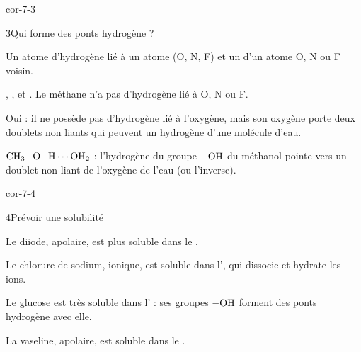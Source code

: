 \begin{blocLivre}{cor-7-3}
\begin{corrige}{3}{Qui forme des ponts hydrogène ?}
\begin{questions}
\item Un atome d'hydrogène lié à un atome  (O, N, F) et un  d'un atome O, N ou F
voisin.
\item {}, ,  et . Le méthane n'a pas d'hydrogène lié à O, N ou F.
\item Oui : il ne possède pas d'hydrogène lié à l'oxygène, mais son oxygène porte deux doublets non liants qui peuvent
 un hydrogène d'une molécule d'eau.
\item $\ce{CH3-O-H}\cdots\ce{OH2}$ : l'hydrogène du groupe $\ce{-OH}$ du méthanol pointe vers un doublet non liant de l'oxygène de l'eau
(ou l'inverse).
\end{questions}
\end{corrige}
\end{blocLivre}
\begin{blocLivre}{cor-7-4}
\begin{corrige}{4}{Prévoir une solubilité}
\begin{questions}
\item Le diiode, apolaire, est plus soluble dans le .
\item Le chlorure de sodium, ionique, est soluble dans l', qui dissocie et hydrate les ions.
\item Le glucose est très soluble dans l' : ses groupes $\ce{-OH}$ forment des ponts hydrogène avec elle.
\item La vaseline, apolaire, est soluble dans le .
\end{questions}
\end{corrige}
\end{blocLivre}
